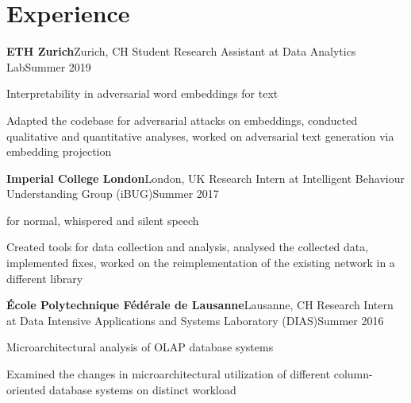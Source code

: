 \section{Experience}

\begin{outerlist}

\entrybig
{\textbf{ETH Zurich}}{Zurich, CH}
{Student Research Assistant at Data Analytics Lab}{Summer 2019}
	\begin{innerlist}
		\item Interpretability in adversarial word embeddings for text
		\detail \item Adapted the codebase for adversarial attacks on embeddings, conducted qualitative and quantitative analyses, worked on adversarial text generation via embedding projection
	\end{innerlist}

\entrybig
{\textbf{Imperial College London}}{London, UK}
{Research Intern at Intelligent Behaviour Understanding Group (iBUG)}{Summer 2017}
	\begin{innerlist}
		\item {} for normal, whispered and silent speech
		\detail \item Created tools for data collection and analysis, analysed the collected data, implemented fixes, worked on the reimplementation of the existing network in a different library
	\end{innerlist}

\entrybig
{\textbf{École Polytechnique Fédérale de Lausanne}}{Lausanne, CH}
{Research Intern at Data Intensive Applications and Systems Laboratory (DIAS)}{Summer 2016}
	\begin{innerlist}
		\item Microarchitectural analysis of OLAP database systems
		\detail \item Examined the changes in microarchitectural utilization of different column-oriented database systems on distinct workload
	\end{innerlist}

\end{outerlist}
